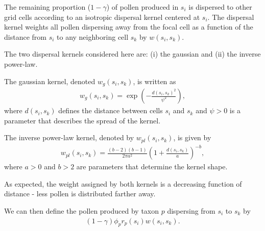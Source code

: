 \documentclass[12pt]{article}
\begin{document}
The remaining proportion ($1-\gamma$) of pollen produced in $s_i$ is
dispersed to other grid cells according to an isotropic dispersal
kernel centered at $s_i$. The dispersal kernel weights all pollen
dispersing away from the focal cell as a function of the distance from
$s_i$ to any neighboring cell $s_k$ by $w(s_i, s_k)$. 

The two dispersal kernels considered here are: (i) the gaussian and
(ii) the inverse power-law.

The gaussian kernel, denoted $w_g(s_i,s_k)$, is written as
\begin{align}
w_g(s_i, s_k) = \exp\left( - \frac{d(s_i, s_k)^2}{\psi^2} \right),
\end{align}
where $d(s_i,s_k)$ defines the distance between cells $s_i$ and $s_k$
and $\psi>0$ is a parameter that describes the spread of the kernel. 

The inverse power-law kernel, denoted by $w_{pl}(s_i,s_k)$, is given by
\begin{align}
w_{pl}(s_i, s_k) = \frac{(b-2)(b-1)}{2 \pi a^2} \left( 1 + \frac{d(s_i, s_k)}{a} \right)^{-b},
\end{align}
where $a>0$ and $b>2$ are parameters that determine the kernel shape. 

As expected, the weight assigned by both kernels is a decreasing function
of distance - less pollen is distributed farther away.

 
We can then define the pollen produced by taxon $p$ dispersing from
$s_i$ to $s_k$ by
\begin{align}
(1-\gamma) \phi_p r_p(s_i) w(s_i, s_k).
\end{align}


\end{document}
